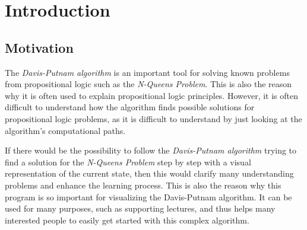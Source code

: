 
\chapter{Introduction}
\label{ch:introduction}

\section{Motivation}
\label{sec:introMotivation}
The \textit{Davis-Putnam algorithm} is an important tool for solving known problems from propositional logic such as the \textit{N-Queens Problem}. This is also the reason why it is often used to explain propositional logic principles. However, it is often difficult to understand how the algorithm finds possible solutions for propositional logic problems, as it is difficult to understand by just looking at the algorithm's computational paths.

If there would be the possibility to follow the \textit{Davis-Putnam algorithm} trying to find a solution for the \textit{N-Queens Problem} step by step with a visual representation of the current state, then this would clarify many understanding problems and enhance the learning process. This is also the reason why this program is so important for visualizing the Davis-Putnam algorithm. It can be used for many purposes, such as supporting lectures, and thus helps many interested people to easily get started with this complex algorithm.

